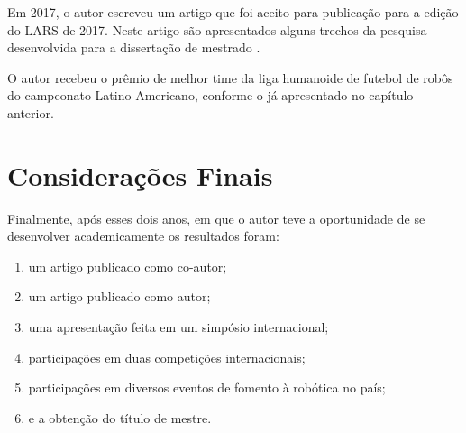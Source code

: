 \documentclass[
  12pt,       %
  oneside,
  a4paper,      %
  english,      %
  french,       %
  spanish,      %
  brazil,       %
  ]{abntex2}
\begin{document}
Em 2017, o autor escreveu um artigo que foi aceito para publicação para a edição do LARS de 2017.
Neste artigo são apresentados alguns trechos da pesquisa desenvolvida para a dissertação de mestrado \cite{almeida2017vision}.

O autor recebeu o prêmio de melhor time da liga humanoide de futebol de robôs do campeonato Latino-Americano, conforme o já apresentado no capítulo anterior.


\chapter{Considerações Finais}

Finalmente, após esses dois anos, em que o autor teve a oportunidade de se desenvolver academicamente os resultados foram:
%
\begin{enumerate}
  \item um artigo publicado como co-autor;

  \item um artigo publicado como autor;

  \item uma apresentação feita em um simpósio internacional;

  \item participações em duas competições internacionais;

  \item participações em diversos eventos de fomento à robótica no país;

  \item e a obtenção do título de mestre.
\end{enumerate}


\postextual


\end{document}
